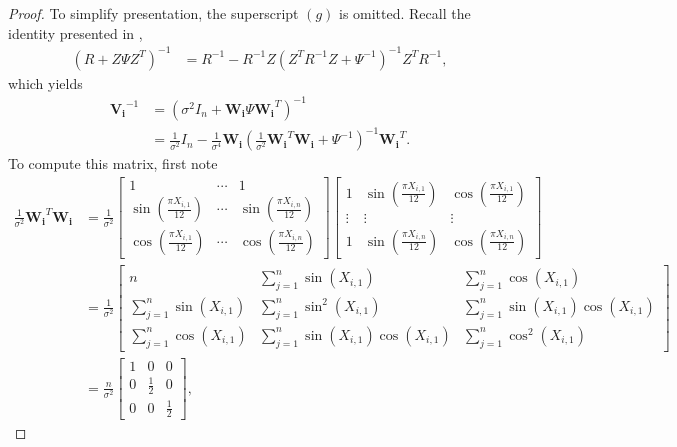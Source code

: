 \begin{proof}
To simplify presentation, the superscript $(g)$ is omitted. Recall the identity presented in \citet[page 78]{Davidian1995},
\begin{align*}
    (R + Z\Psi Z^T)^{-1} &= R^{-1} - R^{-1}Z(Z^TR^{-1}Z + \Psi^{-1})^{-1}Z^TR^{-1},
\end{align*}
which yields
\begin{align*}
    \boldsymbol{V_i}^{-1} &= (\sigma^2I_{n} + \boldsymbol{W_i}\Psi \boldsymbol{W_i}^T)^{-1} \\
    &= \frac{1}{\sigma^2}I_{n} - \frac{1}{\sigma^4}\boldsymbol{W_i}\left(\frac{1}{\sigma^2}\boldsymbol{W_i}^T\boldsymbol{W_i}+\Psi^{-1}\right)^{-1}\boldsymbol{W_i}^T.
\end{align*}
To compute this matrix, first note
\begin{align}
    \frac{1}{\sigma^2}\boldsymbol{W_i}^T\boldsymbol{W_i} &= \frac{1}{\sigma^2}\begin{bmatrix}
    1 & \cdots & 1 \\ 
    \sin\left(\frac{\pi X_{i,1}}{12}\right) & \cdots & \sin\left(\frac{\pi X_{i,n}}{12}\right) \\ 
    \cos\left(\frac{\pi X_{i,1}}{12}\right) & \cdots & \cos\left(\frac{\pi X_{i,n}}{12}\right)   \end{bmatrix} 
    \begin{bmatrix}1 & \sin\left(\frac{\pi X_{i,1}}{12}\right) & \cos\left(\frac{\pi X_{i,1}}{12}\right) \\
    \vdots & \vdots & \vdots \\
    1 & \sin\left(\frac{\pi X_{i,n}}{12}\right) & \cos\left(\frac{\pi X_{i,n}}{12}\right)
    \end{bmatrix} \nonumber \\
    &= \frac{1}{\sigma^2}
    \begin{bmatrix} n & \sum_{j=1}^n\sin(X_{i,1}) & \sum_{j=1}^n\cos(X_{i,1}) \\
    \sum_{j=1}^n\sin(X_{i,1}) & \sum_{j=1}^n\sin^2(X_{i,1}) & \sum_{j=1}^n\sin(X_{i,1})\cos(X_{i,1}) \\
    \sum_{j=1}^n\cos(X_{i,1}) & \sum_{j=1}^n\sin(X_{i,1})\cos(X_{i,1}) & \sum_{j=1}^n\cos^2(X_{i,1})
    \end{bmatrix} \nonumber \\
    &= \frac{n}{\sigma^2}\begin{bmatrix}1 & 0 & 0 \\
    0 & \frac{1}{2} & 0 \\
    0 & 0 & \frac{1}{2}
    \end{bmatrix}, \label{eq:lem_2_1}

\end{align}
\end{proof}
